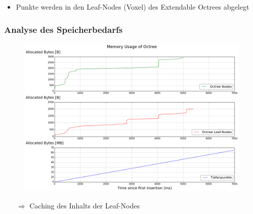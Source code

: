\documentclass[presentation]{beamer}
\begin{document}
\begin{frame}
\begin{itemize}%
	\item Punkte werden in den Leaf-Nodes (Voxel) des Extendable Octrees abgelegt 
\end{itemize}

\end{frame}

\begin{frame}
\frametitle{Analyse des Speicherbedarfs}
\begin{figure}
\centering
\includegraphics[width=0.8\linewidth]{figures/Benchmark_withoutCaching.png}
\label{fig:BenchmarkWithoutCaching} 
\end{figure}
\baselineskip%
\begin{itemize}
	\item [$\Rightarrow$] Caching des Inhalts der Leaf-Nodes
\end{itemize} 
\end{frame} 
\end{document}
